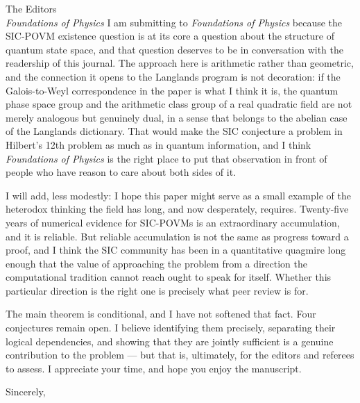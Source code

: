 \documentclass[12pt]{letter}
\begin{document}
\begin{letter}{The Editors\\
\textit{Foundations of Physics}}
I am submitting to \textit{Foundations of Physics} because the SIC-POVM existence question
is at its core a question about the structure of quantum state space, and that question
deserves to be in conversation with the readership of this journal. The approach here is
arithmetic rather than geometric, and the connection it opens to the Langlands program is
not decoration: if the Galois-to-Weyl correspondence in the paper is what I think it is,
the quantum phase space group and the arithmetic class group of a real quadratic field are
not merely analogous but genuinely dual, in a sense that belongs to the abelian case of
the Langlands dictionary. That would make the SIC conjecture a problem in Hilbert's 12th
problem as much as in quantum information, and I think \textit{Foundations of Physics}
is the right place to put that observation in front of people who have reason to care
about both sides of it.

I will add, less modestly: I hope this paper might serve as a small example of the
heterodox thinking the field has long, and now desperately, requires. Twenty-five years 
of numerical evidence for SIC-POVMs is an extraordinary accumulation, and it is reliable. 
But reliable accumulation is not the same as progress toward a proof, and I think the SIC 
community has been in a quantitative quagmire long enough that the value of approaching the 
problem from a direction the computational tradition cannot reach ought to speak for itself. 
Whether this particular direction is the right one is precisely what peer review is for.

The main theorem is conditional, and I have not softened that fact. Four conjectures
remain open. I believe identifying them precisely, separating their logical dependencies,
and showing that they are jointly sufficient is a genuine contribution to the problem ---
but that is, ultimately, for the editors and referees to assess. I appreciate your
time, and hope you enjoy the manuscript.

\closing{Sincerely,}

\end{letter}
\end{document}
